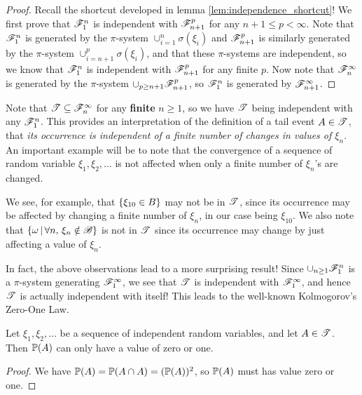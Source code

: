 \begin{proof}
Recall the shortcut developed in lemma \ref{lem:independence_shortcut}! We first prove that $\mathcal{F}_1^n$ is independent with $\mathcal{F}_{n+1}^p$ for any $n+1 \leq p < \infty$. Note that $\mathcal{F}_1^n$ is generated by the $\pi$-system $\cup_{i=1}^n \sigma(\xi_i)$ and $\mathcal{F}_{n+1}^p$ is similarly generated by the $\pi$-system $\cup_{i=n+1}^p \sigma(\xi_i)$, and that these $\pi$-systems are independent, so we know that $\mathcal{F}_1^n$ is independent with $\mathcal{F}_{n+1}^p$ for any finite $p$. Now note that $\mathcal{F}_n^\infty$ is generated by the $\pi$-system $\cup_{p\geq n+1} \mathcal{F}_{n+1}^p$, so $\mathcal{F}_1^n$ is generated by $\mathcal{F}_{n+1}^\infty$.
\end{proof}

Note that $\mathcal{T} \subseteq \mathcal{F}_n^\infty$ for any \textbf{finite} $n \geq 1$, so we have $\mathcal{T}$ being independent with any $\mathcal{F}_1^n$. This provides an interpretation of the definition of a tail event $A \in \mathcal{T}$, that \textit{its occurrence is independent of a finite number of changes in values of $\xi_n$}. An important example will be to note that the convergence of a sequence of random variable $\xi_1, \xi_2, ...$ is not affected when only a finite number of $\xi_n$'s are changed. 

\begin{example}
We see, for example, that $\left\{ \xi_{10} \in B \right \}$ may not be in $\mathcal{T}$, since its occurrence may be affected by changing a finite number of $\xi_n$, in our case being $\xi_{10}$. We also note that $\left\{ \omega \,|\, \forall n, \, \xi_n \notin \mathcal{B} \right \}$ is not in $\mathcal{T}$ since its occurrence may change by just affecting a value of $\xi_n$.
\end{example}

In fact, the above observations lead to a more surprising result! Since $\cup_{n\geq 1} \mathcal{F}_1^n$ is a $\pi$-system generating $\mathcal{F}_1^\infty$, we see that $\mathcal{T}$ is independent with $\mathcal{F}_1^\infty$, and hence $\mathcal{T}$ is actually independent with itself! This leads to the well-known Kolmogorov's Zero-One Law.

\begin{theorem}
Let $\xi_1, \xi_2, \dots$ be a sequence of independent random variables, and let $A \in \mathcal{T}$. Then $\mathbb{P}(A)$ can only have a value of zero or one.
\end{theorem}

\begin{proof}
We have $\mathbb{P}(A) = \mathbb{P}(A \cap A) = (\mathbb{P}(A))^2$, so $\mathbb{P}(A)$ must has value zero or one. 
\end{proof}

